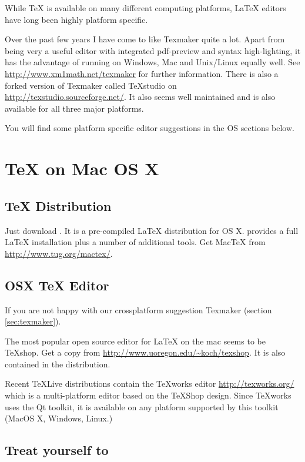 While \TeX{} is available on many different computing platforms, \LaTeX{}
editors have long been highly platform specific.

Over the past few years I have come to like Texmaker quite a lot.
Apart from being very a useful editor with integrated pdf-preview and syntax
high-lighting, it has the advantage of running on Windows, Mac and
Unix/Linux equally well.  See \url{http://www.xm1math.net/texmaker} for
further information.  There is also a forked version of Texmaker called
TeXstudio on \url{http://texstudio.sourceforge.net/}.  It also seems well
maintained and is also available for all three major platforms.

You will find some platform specific editor suggestions in the OS sections
below.

\section{\TeX{} on Mac OS X}

\subsection{\TeX{} Distribution}

Just download . It is a
pre-compiled \LaTeX{} distribution for OS X.  provides a full \LaTeX{}
installation plus a number of additional tools. Get Mac\TeX{} from
\url{http://www.tug.org/mactex/}.

\subsection{OSX \TeX{} Editor}

If you are not happy with our crossplatform suggestion Texmaker (section \ref{sec:texmaker}).
 
The most popular open source editor for \LaTeX{} on the mac seems to be
\TeX{}shop.  Get a copy from \url{http://www.uoregon.edu/~koch/texshop}. It
is also contained in the  distribution.

Recent \TeX Live distributions contain the \TeX{}works editor 
\url{http://texworks.org/} which is a multi-platform editor based on the \TeX{}Shop
design. Since \TeX{}works uses the Qt toolkit, it is available on any platform
supported by this toolkit (MacOS X, Windows, Linux.) 

\subsection{Treat yourself to }

